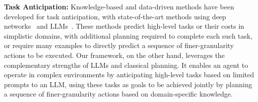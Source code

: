 \vspace{-0.75em}
\textbf{Task Anticipation:} Knowledge-based and data-driven methods have been developed for task anticipation, with state-of-the-art methods using deep networks~\cite{dhakal2023anticipatory} and LLMs~\cite{zhao2023antgpt}. These methods predict high-level tasks or their costs in simplistic domains, with additional planning required to complete each such task, or require many examples to directly predict a sequence of finer-granularity actions to be executed.
Our framework, on the other hand, leverages the complementary strengths of LLMs and classical planning. It enables an agent to operate in complex environments by anticipating high-level tasks based on limited prompts to an LLM, using these tasks as goals to be achieved jointly by planning a sequence of finer-granularity actions based on domain-specific knowledge. %

